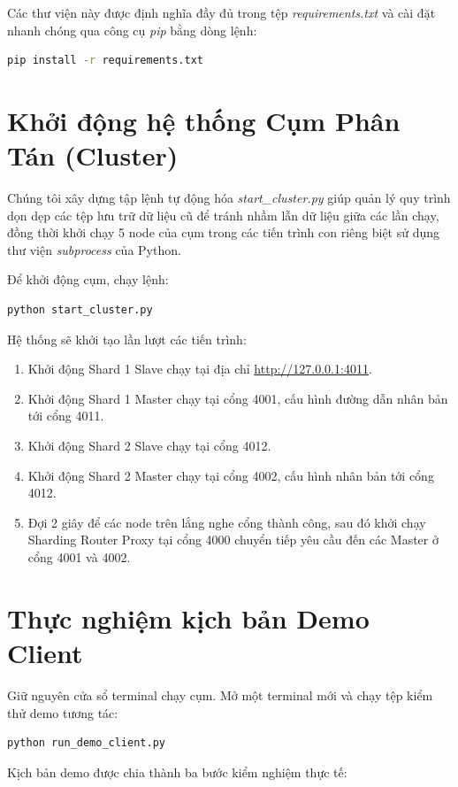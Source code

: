 \documentclass[12pt,a4paper]{report}
\begin{document}
Các thư viện này được định nghĩa đầy đủ trong tệp \textit{requirements.txt} và cài đặt nhanh chóng qua công cụ \textit{pip} bằng dòng lệnh:
\begin{lstlisting}[language=bash]
pip install -r requirements.txt
\end{lstlisting}

\section{Khởi động hệ thống Cụm Phân Tán (Cluster)}
Chúng tôi xây dựng tập lệnh tự động hóa \textit{start\_cluster.py} giúp quản lý quy trình dọn dẹp các tệp lưu trữ dữ liệu cũ để tránh nhầm lẫn dữ liệu giữa các lần chạy, đồng thời khởi chạy 5 node của cụm trong các tiến trình con riêng biệt sử dụng thư viện \textit{subprocess} của Python.

Để khởi động cụm, chạy lệnh:
\begin{lstlisting}[language=bash]
python start_cluster.py
\end{lstlisting}

Hệ thống sẽ khởi tạo lần lượt các tiến trình:
\begin{enumerate}
    \item Khởi động Shard 1 Slave chạy tại địa chỉ \href{http://127.0.0.1:4011}{http://127.0.0.1:4011}.
    \item Khởi động Shard 1 Master chạy tại cổng 4001, cấu hình đường dẫn nhân bản tới cổng 4011.
    \item Khởi động Shard 2 Slave chạy tại cổng 4012.
    \item Khởi động Shard 2 Master chạy tại cổng 4002, cấu hình nhân bản tới cổng 4012.
    \item Đợi 2 giây để các node trên lắng nghe cổng thành công, sau đó khởi chạy Sharding Router Proxy tại cổng 4000 chuyển tiếp yêu cầu đến các Master ở cổng 4001 và 4002.
\end{enumerate}

\section{Thực nghiệm kịch bản Demo Client}
Giữ nguyên cửa sổ terminal chạy cụm. Mở một terminal mới và chạy tệp kiểm thử demo tương tác:
\begin{lstlisting}[language=bash]
python run_demo_client.py
\end{lstlisting}

Kịch bản demo được chia thành ba bước kiểm nghiệm thực tế:
\end{document}
